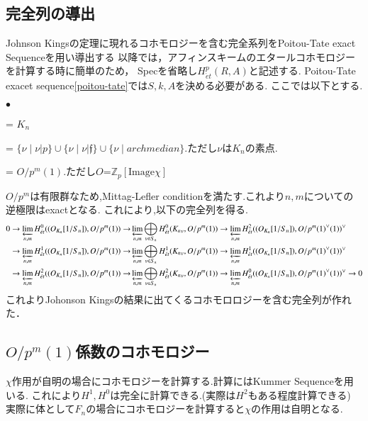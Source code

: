 \documentclass{ujarticle}
\renewenvironment{itemize}%
{%
   \begin{list}{\parbox{1zw}{$\bullet$}}%
   {%
      \setlength{\topsep}{0zh}
      \setlength{\itemindent}{0zw}
      \setlength{\leftmargin}{2zw}%
      \setlength{\rightmargin}{0zw}%
      \setlength{\labelsep}{1zw}%
      \setlength{\labelwidth}{3zw}%
      \setlength{\itemsep}{0em}%
      \setlength{\parsep}{0em}%
      \setlength{\listparindent}{0zw}%
   }
}{%
   \end{list}%
}
\begin{document}
\subsection{完全列の導出}
\label{sub:完全列の導出}
Johnson Kingsの定理に現れるコホモロジーを含む完全系列をPoitou-Tate exact Sequenceを用い導出する
以降では，アフィンスキームのエタールコホモロジーを計算する時に簡単のため，
Specを省略し$H^p_{\acute{e}t}(R,A)$と記述する.
Poitou-Tate exacet sequence\ref{poitou-tate}では$S,k,A$を決める必要がある.
ここでは以下とする.
\begin{itemize}
  \item[$k$]=  $K_n$
  \item[$S$]=  $\{\nu \mid \nu| p\} \cup \{\nu \mid \nu |\mathfrak{f}\} \cup \{\nu \mid archmedian\}$.ただし$\nu$は$K_n$の素点.
  \item[$A$]=  $O/p^m(1)$.ただし$O$=$\mathbb{Z}_p[\mathrm{Image}\chi]$
\end{itemize}
$O/p^m$は有限群なため,Mittag-Lefler conditionを満たす.これより$n,m$についての逆極限はexactとなる.
これにより,以下の完全列を得る.
\begin{equation*}
\begin{split}
0 \rightarrow  \varprojlim\limits_{n,m} H^0_{\acute{e}t}((O_{K_n}[1/S_n]),O/p^m(1)) \rightarrow &\varprojlim\limits_{n,m}\bigoplus\limits_{v \in S_n}H^0_{\acute{e}t}({K_n}_v,O/p^m(1)) \rightarrow \varprojlim\limits_{n,m}H^2_{\acute{e}t}( (O_{K_n}[1/S_n]),{O/p^m(1)}^{\vee}(1))^{\vee} \\
  \rightarrow  \varprojlim\limits_{n,m} H^1_{\acute{e}t}( (O_{K_n}[1/S_n]),O/p^m(1)) \rightarrow &\varprojlim\limits_{n,m}\bigoplus\limits_{v \in S_n}H^1_{\acute{e}t}({K_n}_v,O/p^m(1)) \rightarrow \varprojlim\limits_{n,m}H^1_{\acute{e}t}( (O_{K_n}[1/S_n]),{O/p^m(1)}^{\vee}(1))^{\vee} \\
  \rightarrow  \varprojlim\limits_{n,m}H^2_{\acute{e}t}( (O_{K_n}[1/S_n]),O/p^m(1)) \rightarrow &\varprojlim\limits_{n,m}\bigoplus\limits_{v \in S_n}H^2_{\acute{e}t}({K_n}_v,O/p^m(1)) \rightarrow \varprojlim\limits_{n,m}H^0_{\acute{e}t}( (O_{K_n}[1/S_n]),{O/p^m(1)}^{\vee}(1))^{\vee} \rightarrow 0
\end{split}
\end{equation*}
これよりJohonson Kingsの結果に出てくるコホモロロジーを含む完全列が作れた．
\subsection{$O/p^m(1)$係数のコホモロジー}
\label{sub:$O/p^m$係数のコホモロジー}
$\chi$作用が自明の場合にコホモロジーを計算する.計算にはKummer Sequenceを用いる.
これにより$H^1,H^0$は完全に計算できる.(実際は$H^2$もある程度計算できる)
実際に体として$F_n$の場合にコホモロジーを計算すると$\chi$の作用は自明となる.
\end{document}
